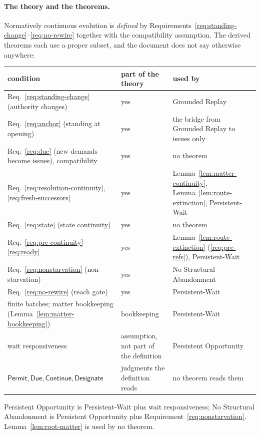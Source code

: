 \documentclass[11pt]{article}
\theoremstyle{definition}
\theoremstyle{remark}
\newcommand{\Permit}{\mathsf{Permit}}
\newcommand{\Due}{\mathsf{Due}}
\newcommand{\Continue}{\mathsf{Continue}}
\newcommand{\Designate}{\mathsf{Designate}}
\begin{document}
\paragraph{The theory and the theorems.}
Normatively continuous evolution is \emph{defined} by
Requirements~\ref{req:standing-change}--\ref{req:no-rewire} together with the
compatibility assumption. The derived theorems each use a proper subset, and
the document does not say otherwise anywhere:
\begin{center}\small
\begin{tabular}{@{}p{}p{}p{}@{}}
\toprule
\textbf{condition} & \textbf{part of the theory} & \textbf{used by} \\
\midrule
Req.~\ref{req:standing-change} (authority changes) & yes & Grounded Replay \\
Req.~\ref{req:anchor} (standing at opening) & yes & the bridge from Grounded Replay to issues only \\
Req.~\ref{req:due} (new demands become issues), compatibility & yes & no theorem \\
Req.~\ref{req:resolution-continuity}, \ref{req:fresh-successors} & yes & Lemma~\ref{lem:matter-continuity}, Lemma~\ref{lem:route-extinction}, Persistent-Wait \\
Req.~\ref{req:state} (state continuity) & yes & no theorem \\
Req.~\ref{req:pre-continuity}--\ref{req:ready} & yes & Lemma~\ref{lem:route-extinction} (\ref{req:pre-refs}), Persistent-Wait \\
Req.~\ref{req:nonstarvation} (non-starvation) & yes & No Structural Abandonment \\
Req.~\ref{req:no-rewire} (reach gate) & yes & Persistent-Wait \\
finite batches; matter bookkeeping (Lemma~\ref{lem:matter-bookkeeping}) & bookkeeping & Persistent-Wait \\
wait responsiveness & assumption, not part of the definition & Persistent Opportunity \\
$\Permit,\Due,\Continue,\Designate$ & judgments the definition reads & no theorem reads them \\
\bottomrule
\end{tabular}
\end{center}
Persistent Opportunity is Persistent-Wait plus wait responsiveness; No
Structural Abandonment is Persistent Opportunity plus
Requirement~\ref{req:nonstarvation}. Lemma~\ref{lem:root-matter} is used by no
theorem.
\end{document}
